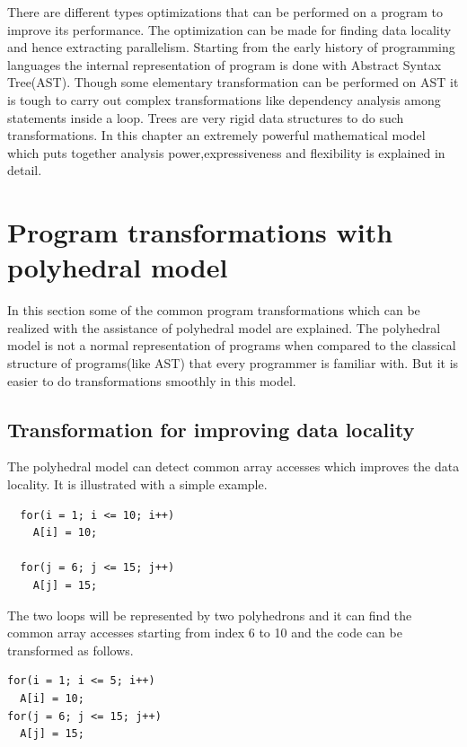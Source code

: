 \label{chap:background}

There are different types optimizations that can be performed on a program to improve its
performance. The optimization can be made for finding data locality and hence extracting
parallelism. Starting from the early history of programming languages the internal representation
of program is done with Abstract Syntax Tree(AST). Though some elementary transformation can
be performed on AST it is tough to carry out complex transformations like dependency analysis among
statements inside a loop. Trees are very rigid data structures to do such transformations.
In this chapter an extremely powerful mathematical model which puts together analysis power,expressiveness and flexibility is explained in detail.

\section{Program transformations with polyhedral model}

In this section some of the common program transformations which can be realized with the
assistance of polyhedral model are explained. The polyhedral model is not a normal
representation of programs when compared to the
classical structure of programs(like AST) that every programmer is familiar with. But
it is easier to do transformations smoothly in this model.

\subsection{Transformation for improving data locality}

The polyhedral model can detect common array accesses which improves the data locality. It is
illustrated with a simple example.
{\footnotesize
\begin{lstlisting}
  for(i = 1; i <= 10; i++)
    A[i] = 10;

  for(j = 6; j <= 15; j++)
    A[j] = 15;
\end{lstlisting}
}

The two loops will be represented by two polyhedrons and it can find the common 
array accesses starting from index 6 to 10 and the code can be transformed as follows.

{\footnotesize
\begin{lstlisting}
for(i = 1; i <= 5; i++)
  A[i] = 10;
for(j = 6; j <= 15; j++)
  A[j] = 15;
\end{lstlisting}
}

